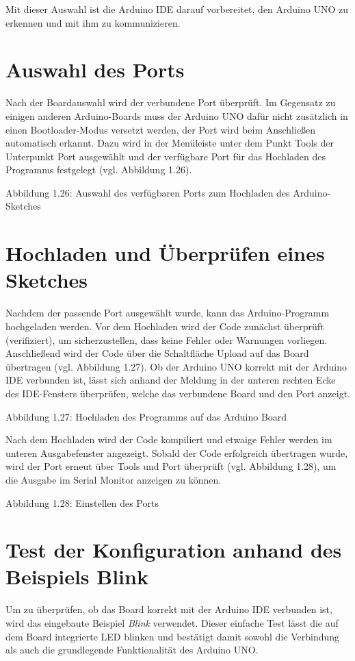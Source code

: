 Mit dieser Auswahl ist die Arduino IDE darauf vorbereitet, den Arduino
UNO zu erkennen und mit ihm zu kommunizieren.

\section{Auswahl des Ports}

Nach der Boardauswahl wird der verbundene Port überprüft. Im Gegensatz
zu einigen anderen Arduino-Boards muss der Arduino UNO dafür nicht
zusätzlich in einen Bootloader-Modus versetzt werden, der Port wird beim
Anschließen automatisch erkannt. Dazu wird in der Menüleiste unter dem
Punkt Tools der Unterpunkt Port ausgewählt und der verfügbare Port für
das Hochladen des Programms festgelegt (vgl. Abbildung 1.26).

Abbildung 1.26: Auswahl des verfügbaren Ports zum Hochladen des Arduino-Sketches
\section{Hochladen und Überprüfen eines Sketches}

Nachdem der passende Port ausgewählt wurde, kann das Arduino-Programm
hochgeladen werden. Vor dem Hochladen wird der Code zunächst überprüft
(verifiziert), um sicherzustellen, dass keine Fehler oder Warnungen
vorliegen. Anschließend wird der Code über die Schaltfläche Upload auf
das Board übertragen (vgl. Abbildung 1.27). Ob der Arduino UNO korrekt
mit der Arduino IDE verbunden ist, lässt sich anhand der Meldung in der
unteren rechten Ecke des IDE-Fensters überprüfen, welche das verbundene
Board und den Port anzeigt.

 Abbildung 1.27: Hochladen des Programms auf das Arduino Board

Nach dem Hochladen wird der Code kompiliert und etwaige Fehler werden im
unteren Ausgabefenster angezeigt. Sobald der Code erfolgreich übertragen
wurde, wird der Port erneut über Tools und Port überprüft (vgl.
Abbildung 1.28), um die Ausgabe im Serial Monitor anzeigen zu können.


Abbildung 1.28: Einstellen des Ports

\section{Test der Konfiguration anhand des Beispiels Blink}

Um zu überprüfen, ob das Board korrekt mit der Arduino IDE verbunden
ist, wird das eingebaute Beispiel \emph{Blink} verwendet. Dieser
einfache Test lässt die auf dem Board integrierte LED blinken und
bestätigt damit sowohl die Verbindung als auch die grundlegende
Funktionalität des Arduino UNO.

